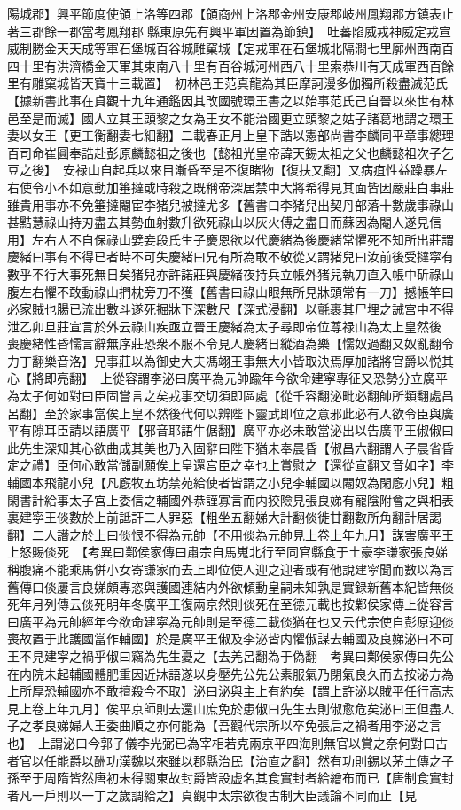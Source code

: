 陽城郡】興平節度使領上洛等四郡【領商州上洛郡金州安康郡岐州鳳翔郡方鎮表止著三郡餘一郡當考鳳翔郡縣東原先有興平軍因置為節鎮】　吐蕃陷威戎神威定戎宣威制勝金天天成等軍石堡城百谷城雕窠城【定戎軍在石堡城北隔澗七里廓州西南百四十里有洪濟橋金天軍其東南八十里有百谷城河州西八十里索恭川有天成軍西百餘里有雕窠城皆天寶十三載置】　初林邑王范真龍為其臣摩訶漫多伽獨所殺盡滅范氏【據新書此事在貞觀十九年通鑑因其改國號環王書之以始事范氏己自晉以來世有林邑至是而滅】國人立其王頭黎之女為王女不能治國更立頭黎之姑子諸葛地謂之環王妻以女王【更工衡翻妻七細翻】二載春正月上皇下誥以憲部尚書李麟同平章事總理百司命崔圓奉誥赴彭原麟懿祖之後也【懿祖光皇帝諱天錫太祖之父也麟懿祖次子乞豆之後】　安禄山自起兵以來目漸昏至是不復睹物【復扶又翻】又病疽性益躁暴左右使令小不如意動加箠撻或時殺之既稱帝深居禁中大將希得見其面皆因嚴莊白事莊雖貴用事亦不免箠撻閹宦李猪兒被撻尤多【舊書曰李猪兒出契丹部落十數歲事祿山甚黠慧祿山持刃盡去其勢血射數升欲死祿山以灰火傅之盡日而蘇因為閹人遂見信用】左右人不自保祿山嬖妾段氏生子慶恩欲以代慶緒為後慶緒常懼死不知所出莊謂慶緒曰事有不得已者時不可失慶緒曰兄有所為敢不敬從又謂猪兒曰汝前後受撻寜有數乎不行大事死無日矣猪兒亦許諾莊與慶緒夜持兵立帳外猪兒執刀直入帳中斫祿山腹左右懼不敢動祿山捫枕旁刀不獲【舊書曰祿山眼無所見牀頭常有一刀】撼帳竿曰必家賊也腸已流出數斗遂死掘牀下深數尺【深式浸翻】以氈裹其尸埋之誡宫中不得泄乙卯旦莊宣言於外云祿山疾亟立晉王慶緒為太子尋即帝位尊禄山為太上皇然後喪慶緒性昏懦言辭無序莊恐衆不服不令見人慶緒日縱酒為樂【懦奴過翻又奴亂翻令力丁翻樂音洛】兄事莊以為御史大夫馮翊王事無大小皆取決焉厚加諸將官爵以悦其心【將即亮翻】　上從容謂李泌曰廣平為元帥踰年今欲命建寜專征又恐勢分立廣平為太子何如對曰臣固嘗言之矣戎事交切須即區處【從千容翻泌毗必翻帥所類翻處昌呂翻】至於家事當俟上皇不然後代何以辨陛下靈武即位之意邪此必有人欲令臣與廣平有隙耳臣請以語廣平【邪音耶語牛倨翻】廣平亦必未敢當泌出以告廣平王俶俶曰此先生深知其心欲曲成其美也乃入固辭曰陛下猶未奉晨昏【俶昌六翻謂人子晨省昏定之禮】臣何心敢當儲副願俟上皇還宫臣之幸也上賞慰之【還從宣翻又音如字】李輔國本飛龍小兒【凡廐牧五坊禁苑給使者皆謂之小兒李輔國以閹奴為閑廐小兒】粗閑書計給事太子宫上委信之輔國外恭謹寡言而内狡險見張良娣有寵陰附會之與相表裏建寜王倓數於上前詆訐二人罪惡【粗坐五翻娣大計翻倓徙甘翻數所角翻計居謁翻】二人譖之於上曰倓恨不得為元帥【不用倓為元帥見上卷上年九月】謀害廣平王上怒賜倓死　【考異曰鄴侯家傳曰肅宗自馬嵬北行至同官縣食于土豪李謙家張良娣稱腹痛不能乘馬併小女寄謙家而去上即位使人迎之迎者或有他說建寜聞而數以為言舊傳曰倓屢言良娣頗專恣與護國連結内外欲傾動皇嗣未知孰是實録新舊本紀皆無倓死年月列傳云倓死明年冬廣平王復兩京然則倓死在至德元載也按鄴侯家傳上從容言曰廣平為元帥經年今欲命建寜為元帥則是至德二載倓猶在也又云代宗使自彭原迎倓喪故置于此護國當作輔國】於是廣平王俶及李泌皆内懼俶謀去輔國及良娣泌曰不可王不見建寜之禍乎俶曰竊為先生憂之【去羌呂翻為于偽翻　考異曰鄴侯家傳曰先公在内院未起輔國體肥重因近牀語遂以身壓先公先公素服氣乃閉氣良久而去按泌方為上所厚恐輔國亦不敢擅殺今不取】泌曰泌與主上有約矣【謂上許泌以賊平任行高志見上卷上年九月】俟平京師則去還山庶免於患俶曰先生去則俶愈危矣泌曰王但盡人子之孝良娣婦人王委曲順之亦何能為【吾觀代宗所以卒免張后之禍者用李泌之言也】　上謂泌曰今郭子儀李光弼已為宰相若克兩京平四海則無官以賞之奈何對曰古者官以任能爵以酬功漢魏以來雖以郡縣治民【治直之翻】然有功則錫以茅土傳之子孫至于周隋皆然唐初未得關東故封爵皆設虚名其食實封者給繒布而已【唐制食實封者凡一戶則以一丁之歲調給之】貞觀中太宗欲復古制大臣議論不同而止【見